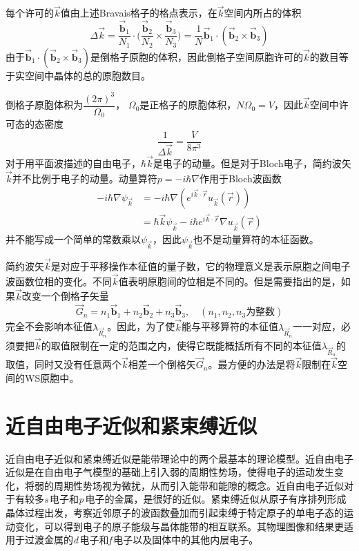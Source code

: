 每个许可的$\vec k$值由上述Bravais格子的格点表示，在$\vec k$空间内所占的体积
\begin{equation}
  \Delta\vec k=\dfrac{\vec{\mathbf b}_1}{N_1}\cdot\biggl(\dfrac{\vec{\mathbf b}_2}{N_2}\times\dfrac{\vec{\mathbf b}_3}{N_3}\biggr)=\dfrac1N\vec{\mathbf b}_1\cdot(\vec{\mathbf b}_2\times\vec{\mathbf b}_3)
  \label{eq:solid-37}
\end{equation}
由于$\vec{\mathbf b}_1\cdot(\vec{\mathbf b}_2\times\vec{\mathbf b}_3)$是倒格子原胞的体积，因此倒格子空间原胞许可的$\vec k$的数目等于实空间中晶体的总的原胞数目。


倒格子原胞体积为$\dfrac{(2\pi)^3}{\Omega_0}$，%
$\Omega_0$是正格子的原胞体积，$N\Omega_0=V$，因此$\vec k$空间中许可态的态密度
\begin{equation}
  \dfrac1{\Delta\vec k}=\dfrac V{8\pi^3}
  \label{eq:solid-38}
\end{equation}
对于用平面波描述的自由电子，$\hbar\vec k$是电子的动量\cite{Yanshousheng}。但是对于Bloch电子，简约波矢$\vec k$并不比例于电子的动量。动量算符$p=-i\hbar\nabla$作用于Bloch波函数%
\begin{equation}
  \begin{split}
  -i\hbar\nabla\psi_{\vec k}&=-i\hbar\nabla(e^{i\vec k\cdot\vec r}u_{\vec k}(\vec r))\\
  &=\hbar\vec k\psi_{\vec k}-i\hbar e^{i\vec k\cdot\vec r}\nabla u_{\vec k}(\vec r)
  \end{split}
  \label{eq:solid-39}
\end{equation}
并不能写成一个简单的常数乘以$\psi_{\vec k}$，因此$\psi_{\vec k}$也不是动量算符的本征函数。


简约波矢$\vec k$是对应于平移操作本征值的量子数，它的物理意义是表示原胞之间电子波函数位相的变化。不同$\vec k$值表明原胞间的位相是不同的。但是需要指出的是，如果$\vec k$改变一个倒格子矢量
\begin{displaymath}
  \vec G_n=n_1\vec{\mathbf b}_1+n_2\vec{\mathbf b}_2+n_3\vec{\mathbf b}_3,\quad(n_1,n_2,n_3\mbox{为整数})
\end{displaymath}
完全不会影响本征值$\lambda_{\vec R_n}$。因此，为了使$\vec k$能与平移算符的本征值$\lambda_{\vec R_n}$一一对应，必须要把$\vec k$的取值限制在一定的范围之内，使得它既能概括所有不同的本征值$\lambda_{\vec R_n}$的取值，同时又没有任意两个$\vec k$相差一个倒格矢$\vec G_n$。最方便的办法是将$\vec k$限制在$\vec k$空间的WS原胞中。

\section{近自由电子近似和紧束缚近似}
近自由电子近似和紧束缚近似是能带理论中的两个最基本的理论模型。近自由电子近似是在自由电子气模型的基础上引入弱的周期性势场，使得电子的运动发生变化，将弱的周期性势场视为微扰，从而引入能带和能隙的概念。近自由电子近似对于有较多{\it s}\,电子和{\it p}\,电子的金属，是很好的近似。紧束缚近似从原子有序排列形成晶体过程出发，考察近邻原子的波函数叠加而引起束缚于特定原子的单电子态的运动变化，可以得到电子的原子能级与晶体能带的相互联系。其物理图像和结果更适用于过渡金属的{\it d}\,电子和{\it f}\,电子以及固体中的其他内层电子。

